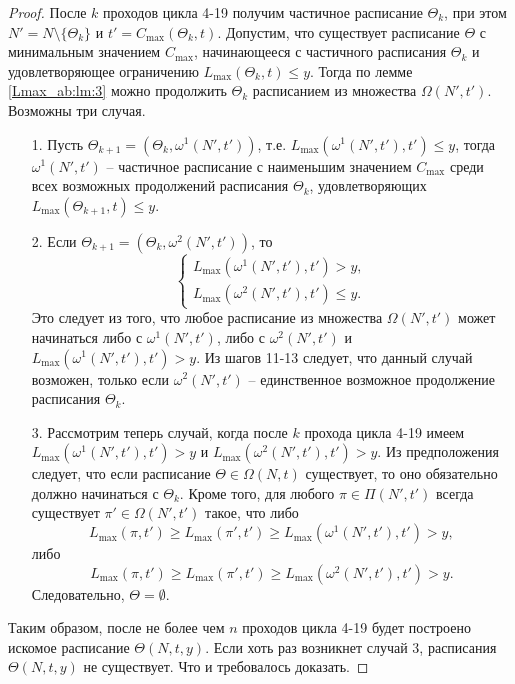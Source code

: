 \begin{proof}
После $k$ проходов цикла 4-19 получим частичное расписание $\Theta_k$, при этом $N' = N \setminus \{ \Theta_k \}$ и $t' = C_{\max}(\Theta_k,t)$. Допустим, что существует расписание $\Theta$ с минимальным значением $C_{\max}$, начинающееся с частичного расписания $\Theta_k$ и удовлетворяющее ограничению $L_{\max}(\Theta_k,t) \leq y$. Тогда по лемме \ref{Lmax_ab:lm:3} можно продолжить $\Theta_k$ расписанием из множества $\Omega(N', t')$. Возможны три случая.
\begin{enumerate}
\item[1.] Пусть $\Theta_{k+1} = (\Theta_k,\omega^1(N', t'))$, т.е. $L_{\max}(\omega^1(N',t'),t') \leq y$, тогда $\omega^1(N',t')$ -- частичное расписание с наименьшим значением $C_{\max}$ среди всех возможных продолжений расписания $\Theta_k$, удовлетворяющих $L_{\max}(\Theta_{k+1}, t) \leq y$.\\
\item[2.] Если $\Theta_{k+1} = (\Theta_k,\omega^2(N',t'))$, то
\begin{equation*}
    \begin{cases}
        L_{\max}(\omega^1(N',t'),t') > y,\\
        L_{\max}(\omega^2(N',t'),t') \leq y.
    \end{cases}
\end{equation*}
Это следует из того, что любое расписание из множества $\Omega(N',t')$ может начинаться либо с $\omega^1(N', t')$, либо с $\omega^2(N',t')$ и $L_{\max}(\omega^1(N', t'),t') > y$. Из шагов 11-13 следует, что данный случай возможен, только если $\omega^2(N',t')$ -- единственное возможное продолжение расписания $\Theta_k$.
\item[3.] Рассмотрим теперь случай, когда после $k$ прохода цикла 4-19  имеем $L_{\max}(\omega^1(N', t'),t') > y$ и $L_{\max}(\omega^2(N', t'), t') > y$. Из предположения следует, что если расписание $\Theta \in \Omega(N, t)$ существует, то оно обязательно должно начинаться с $\Theta_k$. Кроме того, для любого $\pi \in \Pi(N',t')$ всегда существует $\pi' \in \Omega(N',t')$ такое, что либо
    $$L_{\max}(\pi,t') \geq L_{\max}(\pi', t') \geq L_{\max}(\omega^1(N', t'),t') > y,$$
    либо
    $$L_{\max}(\pi,t') \geq L_{\max}(\pi', t') \geq L_{\max}(\omega^2(N', t'),t') > y.$$
    Следовательно, $\Theta = \emptyset$.
\end{enumerate}
Таким образом, после не более чем $n$ проходов цикла 4-19 будет построено искомое расписание $\Theta(N, t, y)$. Если хоть раз возникнет случай 3, расписания $\Theta(N, t, y)$ не существует. Что и требовалось доказать.
\end{proof}

